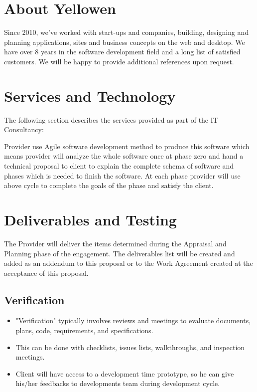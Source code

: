 \documentclass[a4paper,12pt]{article}
\begin{document}
\section*{About Yellowen}
Since 2010, we've worked with start-ups and companies, building, designing and planning applications,
sites and business concepts on the web and desktop. We have over 8 years in the software development field and a
long list of satisfied customers. We will be happy to provide additional references upon request.

\section*{Services and Technology}
The following section describes the services provided as part of the IT
Consultancy:

Provider use Agile software development method to produce this software
which means provider will analyze the whole software once at phase zero
and hand a technical proposal to client to explain the complete schema of
software and phases which is needed to finish the software. At each phase
provider will use above cycle to complete the goals of the phase and satisfy
the client.

\section*{Deliverables and Testing}
The Provider will deliver the items determined during the Appraisal and
Planning phase of the engagement. The deliverables list will be created and
added as an addendum to this proposal or to the Work Agreement created
at the acceptance of this proposal.


\subsection*{Verification}
\begin{itemize}
\item {"Verification" typically involves reviews and meetings to evaluate
  documents, plans, code, requirements, and specifications.}
\item{This can be done with checklists, issues lists, walkthroughs, and
  inspection meetings.}
\item{Client will have access to a development time prototype, so he can give
    his/her feedbacks to developments team during development cycle.}
\end{itemize}
\end{document}
